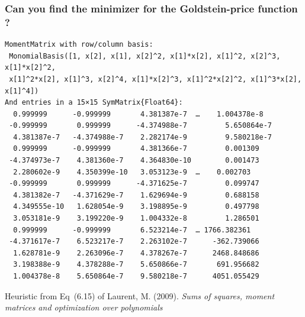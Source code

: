 \documentclass{beamer}
\newcommand\Wider[2][3em]{%
\makebox[\linewidth][c]{%
  \begin{minipage}{\dimexpr\textwidth+#1\relax}
  \raggedright#2
  \end{minipage}%
  }%
}
\begin{document}
\begin{frame}[fragile]
  \frametitle{Can you find the minimizer for the Goldstein-price function ?}
  \vspace{-0.5em}
  \scriptsize
  \begin{verbatim}
MomentMatrix with row/column basis:
 MonomialBasis([1, x[2], x[1], x[2]^2, x[1]*x[2], x[1]^2, x[2]^3, x[1]*x[2]^2,
 x[1]^2*x[2], x[1]^3, x[2]^4, x[1]*x[2]^3, x[1]^2*x[2]^2, x[1]^3*x[2], x[1]^4])
And entries in a 15×15 SymMatrix{Float64}:
  0.999999      -0.999999       4.381387e-7  …    1.004378e-8
 -0.999999       0.999999      -4.374988e-7         5.650864e-7
  4.381387e-7   -4.374988e-7    2.282174e-9         9.580218e-7
  0.999999      -0.999999       4.381366e-7         0.001309
 -4.374973e-7    4.381360e-7    4.364830e-10        0.001473
  2.280602e-9    4.350399e-10   3.053123e-9  …    0.002703
 -0.999999       0.999999      -4.371625e-7         0.099747
  4.381382e-7   -4.371629e-7    1.629694e-9         0.688158
  4.349555e-10   1.628054e-9    3.198895e-9         0.497798
  3.053181e-9    3.199220e-9    1.004332e-8         1.286501
  0.999999      -0.999999       6.523214e-7  … 1766.382361
 -4.371617e-7    6.523217e-7    2.263102e-7      -362.739066
  1.628781e-9    2.263096e-7    4.378267e-7      2468.848686
  3.198388e-9    4.378288e-7    5.650866e-7       691.956682
  1.004378e-8    5.650864e-7    9.580218e-7      4051.055429
  \end{verbatim}

  \vspace{-2em}

  {
  \tiny
  \alert{Heuristic} from Eq~(6.15) of Laurent, M. (2009). \emph{Sums of squares, moment matrices and optimization over polynomials}
  }
\end{frame}
\end{document}
